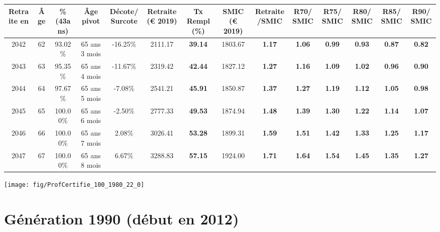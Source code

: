 \begin{adjustbox}{max width=\textwidth} 
\begin{tabular}[htb]{|c|c||c|c|c||c|c||c|c||c|c|c|c|c|} 
\hline 
 Retraite en &  Âge &  \%(43ans) &  Âge pivot &  Décote/Surcote &  Retraite (\euro{} 2019) &  Tx Rempl(\%) &  SMIC (\euro{} 2019) &  Retraite/SMIC &  R70/SMIC &  R75/SMIC &  R80/SMIC &  R85/SMIC &  R90/SMIC \\ 
\hline \hline 
 2042 &  62 &  93.02\% &  65 ans 3 mois &  -16.25\% &  2111.17 &  {\bf 39.14} &  1803.67 &  {\bf 1.17} &  {\bf 1.06} &  {\bf {\color{red} 0.99}} &  {\bf {\color{red} 0.93}} &  {\bf {\color{red} 0.87}} &  {\bf {\color{red} 0.82}} \\ 
\hline 
 2043 &  63 &  95.35\% &  65 ans 4 mois &  -11.67\% &  2319.42 &  {\bf 42.44} &  1827.12 &  {\bf 1.27} &  {\bf 1.16} &  {\bf 1.09} &  {\bf 1.02} &  {\bf {\color{red} 0.96}} &  {\bf {\color{red} 0.90}} \\ 
\hline 
 2044 &  64 &  97.67\% &  65 ans 5 mois &  -7.08\% &  2541.21 &  {\bf 45.91} &  1850.87 &  {\bf 1.37} &  {\bf 1.27} &  {\bf 1.19} &  {\bf 1.12} &  {\bf 1.05} &  {\bf {\color{red} 0.98}} \\ 
\hline 
 2045 &  65 &  100.00\% &  65 ans 6 mois &  -2.50\% &  2777.33 &  {\bf 49.53} &  1874.94 &  {\bf 1.48} &  {\bf 1.39} &  {\bf 1.30} &  {\bf 1.22} &  {\bf 1.14} &  {\bf 1.07} \\ 
\hline 
 2046 &  66 &  100.00\% &  65 ans 7 mois &  2.08\% &  3026.41 &  {\bf 53.28} &  1899.31 &  {\bf 1.59} &  {\bf 1.51} &  {\bf 1.42} &  {\bf 1.33} &  {\bf 1.25} &  {\bf 1.17} \\ 
\hline 
 2047 &  67 &  100.00\% &  65 ans 8 mois &  6.67\% &  3288.83 &  {\bf 57.15} &  1924.00 &  {\bf 1.71} &  {\bf 1.64} &  {\bf 1.54} &  {\bf 1.45} &  {\bf 1.35} &  {\bf 1.27} \\ 
\hline 
\hline 
\end{tabular} 
\end{adjustbox} 
 
 \vspace{0.1cm} 

 {\hspace{-2.2cm}\texttt{[image: fig/ProfCertifie\_100\_1980\_22\_0]}} 

\newpage 
 
\section{Génération 1990 (début en 2012)\label{ProfCertifie_100_1990_22_0}} 
 
